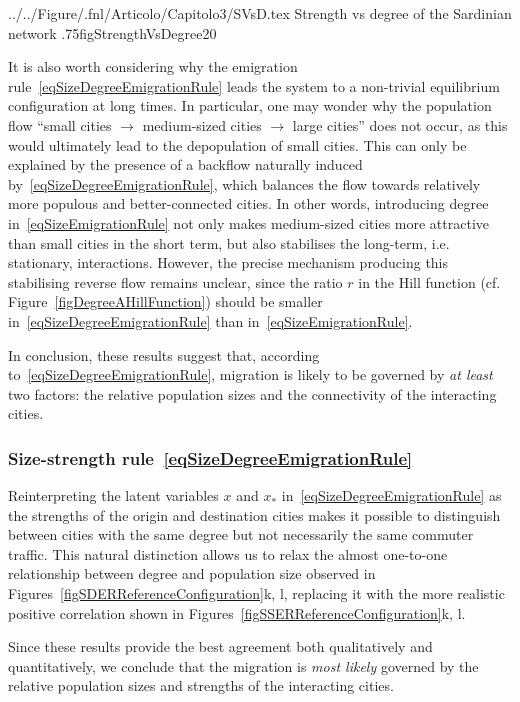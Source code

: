 \documentclass[a4paper]{article}
\begin{document}
  {../../Figure/.fnl/Articolo/Capitolo3/SVsD.tex}
  {Strength vs degree of the Sardinian network}
  {.75\linewidth}{figStrengthVsDegree20}
            
It is also worth considering why the emigration rule~\eqref{eqSizeDegreeEmigrationRule} leads the system to a non-trivial equilibrium configuration at long times. In particular, one may wonder why the population flow ``small cities $\to$ medium-sized cities $\to$ large cities'' does not occur, as this would ultimately lead to the depopulation of small cities. This can only be explained by the presence of a backflow naturally induced by~\eqref{eqSizeDegreeEmigrationRule}, which balances the flow towards relatively more populous and better-connected cities. In other words, introducing degree in~\eqref{eqSizeEmigrationRule} not only makes medium-sized cities more attractive than small cities in the short term, but also stabilises the long-term, i.e. stationary, interactions. However, the precise mechanism producing this stabilising reverse flow remains unclear, since the ratio $r$ in the Hill function (cf. Figure~\ref{figDegreeAHillFunction}) should be smaller in~\eqref{eqSizeDegreeEmigrationRule} than in~\eqref{eqSizeEmigrationRule}.
                
In conclusion, these results suggest that, according to~\eqref{eqSizeDegreeEmigrationRule}, migration is likely to be governed by \textit{at least} two factors: the relative population sizes and the connectivity of the interacting cities.
            
\subsubsection{Size-strength rule~\texorpdfstring{\eqref{eqSizeDegreeEmigrationRule}}{}}
Reinterpreting the latent variables $x$ and $x_\ast$ in~\eqref{eqSizeDegreeEmigrationRule} as the strengths of the origin and destination cities makes it possible to distinguish between cities with the same degree but not necessarily the same commuter traffic. This natural distinction allows us to relax the almost one-to-one relationship between degree and population size observed in Figures~\ref{figSDERReferenceConfiguration}k, l, replacing it with the more realistic positive correlation shown in Figures~\ref{figSSERReferenceConfiguration}k, l.
            
Since these results provide the best agreement both qualitatively and quantitatively, we conclude that the migration is \textit{most likely} governed by the relative population sizes and strengths of the interacting cities.
            
\end{document}
